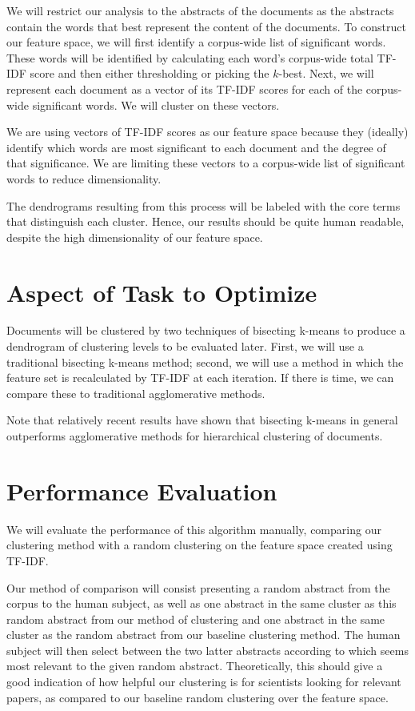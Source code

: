\documentclass{acm_proc_article-sp}
\begin{document}
We will restrict our analysis to the abstracts of the documents as the abstracts contain the words that best represent the content of the documents. To construct our feature space, we will first identify a corpus-wide list of significant words. These words will be identified by calculating each word's corpus-wide total TF-IDF score and then either thresholding or picking the $k$-best. Next, we will represent each document as a vector of its TF-IDF scores for each of the corpus-wide significant words. We will cluster on these vectors.

We are using vectors of TF-IDF scores as our feature space because they (ideally) identify which words are most significant to each document and the degree of that significance. We are limiting these vectors to a corpus-wide list of significant words to reduce dimensionality.

The dendrograms resulting from this process will be labeled with the core terms that distinguish each cluster. Hence, our results should be quite human readable, despite the high dimensionality of our feature space.

\section{Aspect of Task to Optimize}
Documents will be clustered by two techniques of bisecting k-means to produce a dendrogram of clustering levels to be evaluated later. First, we will use a traditional bisecting k-means method; second, we will use a method in which the feature set is recalculated by TF-IDF at each iteration. If there is time, we can compare these to traditional agglomerative methods. 

Note that relatively recent results have shown that bisecting k-means in general outperforms agglomerative methods for hierarchical clustering of documents.\cite{steinbach2000}\cite{zhao2005}

\section{Performance Evaluation}
We will evaluate the performance of this algorithm manually, comparing our clustering method with a random clustering on the feature space created using TF-IDF.

Our method of comparison will consist presenting a random abstract from the corpus to the human subject, as well as one abstract in the same cluster as this random abstract from our method of clustering and one abstract in the same cluster as the random abstract from our baseline clustering method. The human subject will then select between the two latter abstracts according to which seems most relevant to the given random abstract. Theoretically, this should give a good indication of how helpful our clustering is for scientists looking for relevant papers, as compared to our baseline random clustering over the feature space.
\end{document}

